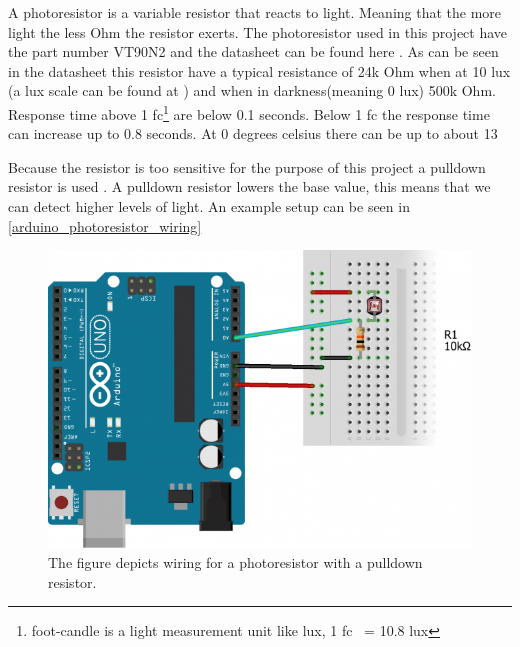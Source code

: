 A photoresistor is a variable resistor that reacts to light. Meaning that the more light the less Ohm the resistor exerts. The photoresistor used in this project have the part number VT90N2 and the datasheet can be found here \cite{photoresistor_sheet}. As can be seen in the datasheet this resistor have a typical resistance of 24k Ohm when at 10 lux (a lux scale can be found at \cite{lux_scale}) and when in darkness(meaning 0 lux) 500k Ohm. Response time above 1 fc\footnote{foot-candle is a light measurement unit like lux, 1 fc ~= 10.8 lux} are below 0.1 seconds. Below 1 fc the response time can increase up to 0.8 seconds. At 0 degrees celsius there can be up to about 13%

Because the resistor is too sensitive for the purpose of this project a pulldown resistor is used \cite{pulldown_resistor}. A pulldown resistor lowers the base value, this means that we can detect higher levels of light. An example setup can be seen in \cref{arduino_photoresistor_wiring}
\begin{figure}[htbp]
  \centering
  \includegraphics[width=\textwidth]{Design/PhotoSensorTests/Images/photoresistor_setup.png}
  \caption{The figure depicts wiring for a photoresistor with a pulldown resistor.}
  \label{fig:arduino_photoresistor_wiring}
\end{figure}


